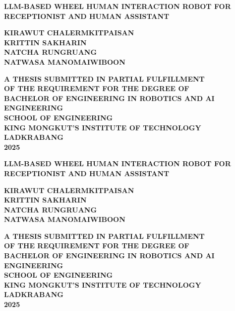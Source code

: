 \documentclass[a4paper]{extreport}
\begin{document}
\begin{titlepage}
    \centering
    \fontsize{18pt}{18pt}\bfseries LLM-BASED WHEEL HUMAN INTERACTION ROBOT FOR RECEPTIONIST AND HUMAN ASSISTANT \\[1.5em]
    \vfill
    \begin{center}
        {\fontsize{18pt}{18pt}\bfseries
            KIRAWUT CHALERMKITPAISAN \\
            KRITTIN SAKHARIN \\
            NATCHA RUNGRUANG \\
            NATWASA MANOMAIWIBOON\par}
    \end{center}
    \vfill
    \vfill
    {\fontsize{18pt}{18pt}\bfseries
    A THESIS SUBMITTED IN PARTIAL FULFILLMENT \\ OF THE REQUIREMENT FOR THE DEGREE OF \\ BACHELOR OF ENGINEERING IN ROBOTICS AND AI ENGINEERING \\ SCHOOL OF ENGINEERING \\ KING MONGKUT'S INSTITUTE OF TECHNOLOGY LADKRABANG \\ 2025 }
\end{titlepage}

\begin{titlepage}
    \centering
    \fontsize{18pt}{18pt}\bfseries LLM-BASED WHEEL HUMAN INTERACTION ROBOT FOR RECEPTIONIST AND HUMAN ASSISTANT \\[1.5em]
    \vfill
    \begin{center}
        {\fontsize{18pt}{18pt}\bfseries
            KIRAWUT CHALERMKITPAISAN \\
            KRITTIN SAKHARIN \\
            NATCHA RUNGRUANG \\
            NATWASA MANOMAIWIBOON\par}
    \end{center}
    \vfill
    \vfill
    {\fontsize{18pt}{18pt}\bfseries
        A THESIS SUBMITTED IN PARTIAL FULFILLMENT \\ OF THE REQUIREMENT FOR THE DEGREE OF \\ BACHELOR OF ENGINEERING IN ROBOTICS AND AI ENGINEERING \\ SCHOOL OF ENGINEERING \\ KING MONGKUT'S INSTITUTE OF TECHNOLOGY LADKRABANG \\ 2025 }
\end{titlepage}
\end{document}

